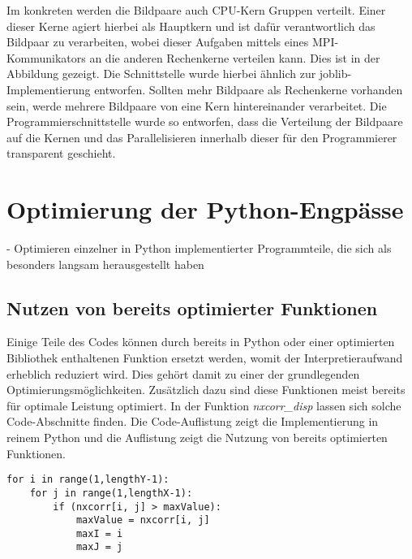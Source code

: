 Im konkreten werden die Bildpaare auch \gls{CPU}-Kern Gruppen verteilt. Einer dieser Kerne agiert hierbei als Hauptkern und ist dafür verantwortlich das Bildpaar zu verarbeiten, wobei dieser Aufgaben mittels eines \gls{MPI}-Kommunikators an die anderen Rechenkerne verteilen kann. Dies ist in der Abbildung  gezeigt. Die Schnittstelle wurde hierbei ähnlich zur joblib-Implementierung entworfen. Sollten mehr Bildpaare als Rechenkerne vorhanden sein, werde mehrere Bildpaare von eine Kern hintereinander verarbeitet. Die Programmierschnittstelle wurde so entworfen, dass die Verteilung der Bildpaare auf die Kernen und das Parallelisieren innerhalb dieser für den Programmierer transparent geschieht. 


\section{Optimierung der Python-Engpässe}

\begin{correctmore}
	- Optimieren einzelner in Python implementierter Programmteile, die sich als besonders langsam herausgestellt haben
\end{correctmore}

\subsection{Nutzen von bereits optimierter Funktionen}

Einige Teile des Codes können durch bereits in Python oder einer optimierten Bibliothek enthaltenen Funktion ersetzt werden, womit der Interpretieraufwand erheblich reduziert wird. Dies gehört damit zu einer der grundlegenden Optimierungsmöglichkeiten. Zusätzlich dazu sind diese Funktionen meist bereits für optimale Leistung optimiert. In der Funktion \textit{nxcorr\_disp} lassen sich solche Code-Abschnitte finden. Die Code-Auflistung  zeigt die Implementierung in reinem Python und die Auflistung  zeigt die Nutzung von bereits optimierten Funktionen. 

\begin{lstlisting}
for i in range(1,lengthY-1):
	for j in range(1,lengthX-1):
		if (nxcorr[i, j] > maxValue):
			maxValue = nxcorr[i, j]
			maxI = i
			maxJ = j
\end{lstlisting}

